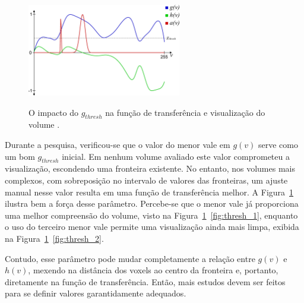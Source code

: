 \begin{figure}[t]
{		\includegraphics[width=0.6\textwidth]{images/g_bonsai_ft}
		\label{fig:thresh_2}
	}
	\caption{O impacto do $g_{thresh}$ na função de transferência e visualização do volume .}
	\label{fig:g_thresh}
\end{figure}

	Durante a pesquisa, verificou-se que o valor do menor vale em $ g(v) $ serve como um bom $ g_{thresh} $ inicial. Em nenhum volume avaliado este valor comprometeu a visualização, escondendo uma fronteira existente. No entanto, nos volumes mais complexos, com sobreposição no intervalo de valores das fronteiras, um ajuste manual nesse valor resulta em uma função de transferência melhor. A Figura~\ref{fig:g_thresh} ilustra bem a força desse parâmetro. Percebe-se que o menor vale já proporciona uma melhor compreensão do volume, visto na Figura~\ref{fig:g_thresh}~\ref{fig:thresh_1}, enquanto o uso do terceiro menor vale permite uma visualização ainda mais limpa, exibida na Figura~\ref{fig:g_thresh}~\ref{fig:thresh_2}.
	
	Contudo, esse parâmetro pode mudar completamente a relação entre $ g(v) $ e $ h(v) $, mexendo na distância dos voxels ao centro da fronteira e, portanto, diretamente na função de transferência. Então, mais estudos devem ser feitos para se definir valores garantidamente adequados.
	
